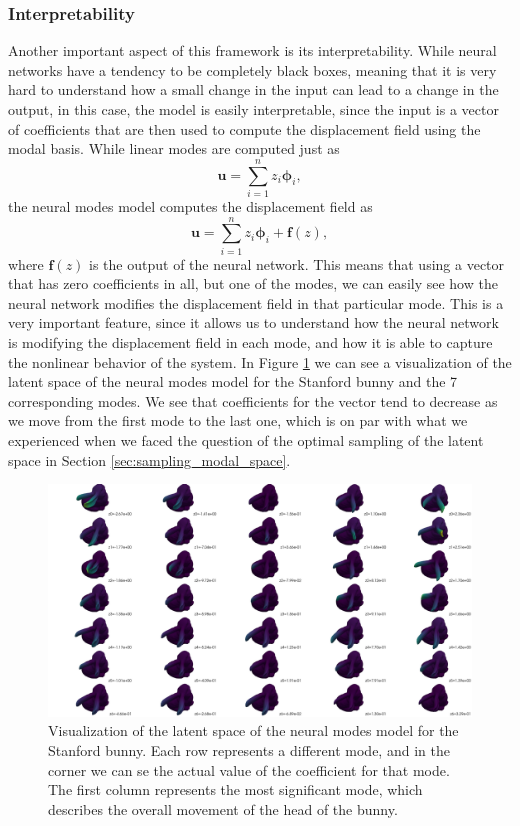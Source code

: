 \subsubsection{Interpretability}
Another important aspect of this framework is its interpretability. While neural networks have a tendency to be completely black boxes, meaning that it is very hard to understand how a small change in the input can lead to a change in the output, in this case, the model is easily interpretable, since the input is a vector of coefficients that are then used to compute the displacement field using the modal basis. While linear modes are computed just as 
\begin{equation*}
    \bm{u} = \sum_{i=1}^n z_i \bm{\phi}_i,
    \end{equation*}
    the neural modes model computes the displacement field as
    \begin{equation*}
    \bm{u} = \sum_{i=1}^n z_i \bm{\phi}_i + \bm{f}(z),
    \end{equation*}
    where $\bm{f}(z)$ is the output of the neural network. This means that using a vector that has zero coefficients in all, but one of the modes, we can easily see how the neural network modifies the displacement field in that particular mode. This is a very important feature, since it allows us to understand how the neural network is modifying the displacement field in each mode, and how it is able to capture the nonlinear behavior of the system. 
    In Figure \ref{fig:latent_space_viz} we can see a visualization of the latent space of the neural modes model for the Stanford bunny and the 7 corresponding modes. We see that coefficients for the vector tend to decrease as we move from the first mode to the last one, which is on par with what we experienced when we faced the question of the optimal sampling of the latent space in Section \ref{sec:sampling_modal_space}.

\begin{figure}[ht]
    \centering
    \includegraphics[width=\textwidth]{Images/latent_space_viz.png}
    \caption{Visualization of the latent space of the neural modes model for the Stanford bunny. Each row represents a different mode, and in the corner we can se the actual value of the coefficient for that mode. The first column represents the most significant mode, which describes the overall movement of the head of the bunny.}
    \label{fig:latent_space_viz}
    \end{figure}
    

